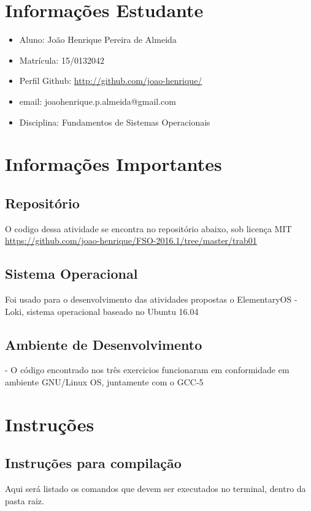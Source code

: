 \documentclass[11pt,a4paper]{article}
\begin{document}
\section{Informações Estudante}
\begin{itemize}
\item Aluno: João Henrique Pereira de Almeida
\item Matrícula: 15/0132042
\item Perfil Github: \href{http://github.com/joao-henrique/}{http://github.com/joao-henrique/}
\item email: joaohenrique.p.almeida@gmail.com
\item Disciplina: Fundamentos de Sistemas Operacionais

\end{itemize}


\section{Informações Importantes}
\subsection{Repositório}
O codigo dessa atividade se encontra no repositório abaixo, sob licença MIT
\url{https://github.com/joao-henrique/FSO-2016.1/tree/master/trab01}
\subsection{Sistema Operacional}


Foi usado para o desenvolvimento das atividades propostas o ElementaryOS - Loki, sistema operacional baseado no Ubuntu 16.04

\subsection{Ambiente de Desenvolvimento }
- O código encontrado nos três exercicios funcionaram em
conformidade em ambiente GNU/Linux OS, juntamente com o GCC-5

\section{Instruções}


\subsection{Instruções para compilação}
Aqui será listado os comandos que devem ser executados no terminal, dentro da pasta raiz.
\end{document}
